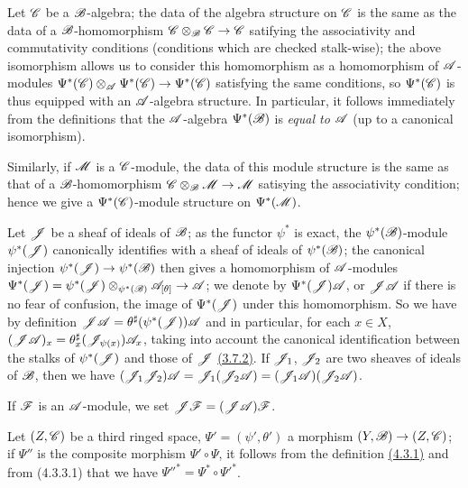 \begin{env}[4.3.4]
\label{env-0.4.3.4}
Let $\mathscr{C}$ be a $\mathscr{B}$-algebra; the data of the algebra structure on
$\mathscr{C}$ is the same as the data of a $\mathscr{B}$-homomorphism
$\mathscr{C}\otimes_\mathscr{B}\mathscr{C}\to\mathscr{C}$ satifying the associativity and
commutativity conditions (conditions which are checked stalk-wise); the above
isomorphism allows us to consider this homomorphism as a homomorphism of
$\mathscr{A}$-modules $\Psi^*(\mathscr{C})\otimes_\mathscr{A}\Psi^*(\mathscr{C})\to\Psi^*(\mathscr{C})$
satisfying the same conditions, so $\Psi^*(\mathscr{C})$ is thus equipped with an
$\mathscr{A}$-algebra structure. In particular, it follows immediately from the
definitions that the $\mathscr{A}$-algebra $\Psi^*(\mathscr{B})$ is {\em equal to
$\mathscr{A}$} (up to a canonical isomorphism).

Similarly, if $\mathscr{M}$ is a $\mathscr{C}$-module, the data of this module structure
is the same
as that of a $\mathscr{B}$-homomorphism $\mathscr{C}\otimes_\mathscr{B}\mathscr{M}\to\mathscr{M}$
satisying the associativity condition; hence we give a $\Psi^*(\mathscr{C})$-module
structure on $\Psi^*(\mathscr{M})$.
\end{env}

\begin{env}[4.3.5]
\label{env-0.4.3.5}
Let $\mathscr{J}$ be a sheaf of ideals of $\mathscr{B}$; as the functor $\psi^*$ is exact,
the $\psi^*(\mathscr{B})$-module $\psi^*(\mathscr{J})$ canonically identifies with a sheaf
of ideals of $\psi^*(\mathscr{B})$; the canonical injection
$\psi^*(\mathscr{J})\to\psi^*(\mathscr{B})$ then gives a homomorphism of $\mathscr{A}$-modules
$\Psi^*(\mathscr{J})=\psi^*(\mathscr{J})\otimes_{\psi^*(\mathscr{B})}\mathscr{A}_{[\theta]}
  \to\mathscr{A}$; we denote by $\Psi^*(\mathscr{J})\mathscr{A}$, or $\mathscr{J}\mathscr{A}$ if there is
no fear of confusion, the image of $\Psi^*(\mathscr{J})$ under this homomorphism. So
we have by definition $\mathscr{J}\mathscr{A}=\theta^\sharp(\psi^*(\mathscr{J}))\mathscr{A}$ and in
particular, for each $x\in X$,
$(\mathscr{J}\mathscr{A})_x=\theta_x^\sharp(\mathscr{J}_{\psi(x)})\mathscr{A}_x$, taking into
account the canonical identification between the stalks of $\psi^*(\mathscr{J})$ and
those of $\mathscr{J}$ \hyperref[env-0.3.7.2]{(3.7.2)}. If $\mathscr{J}_1$, $\mathscr{J}_2$ are two sheaves
of ideals of $\mathscr{B}$, then we have
$(\mathscr{J}_1\mathscr{J}_2)\mathscr{A}
  =\mathscr{J}_1(\mathscr{J}_2\mathscr{A})=(\mathscr{J}_1\mathscr{A})(\mathscr{J}_2\mathscr{A})$.

If $\mathscr{F}$ is an $\mathscr{A}$-module, we set $\mathscr{J}\mathscr{F}=(\mathscr{J}\mathscr{A})\mathscr{F}$.
\end{env}

\begin{env}[4.3.6]
\label{env-0.4.3.6}
Let $(Z,\mathscr{C})$ be a third ringed space, $\Psi'=(\psi',\theta')$ a morphism
$(Y,\mathscr{B})\to(Z,\mathscr{C})$; if $\Psi''$ is the composite morphism
$\Psi'\circ\Psi$, it follows from the definition \hyperref[env-0.4.3.1]{(4.3.1)} and from
(4.3.3.1) that we have ${\Psi''}^*=\Psi^*\circ{\Psi'}^*$.
\end{env}


